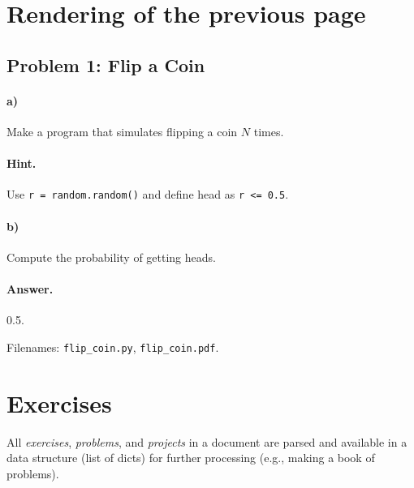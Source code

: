 \documentclass[%
twoside,                 %
final,                   %
chapterprefix=true,      %
open=right               %
10pt]{book}
\newcounter{doconce:movie:counter}
\newenvironment{doconce:exercise}{}{}
\newcounter{doconce:exercise:counter}
\begin{document}
\section*{Rendering of the previous page}




\begin{doconce:exercise}

\subsection*{Problem 1: Flip a Coin}


\paragraph{a)}
Make a program that simulates flipping a coin $N$ times.


\paragraph{Hint.}
Use \Verb!r = random.random()! and define head as \Verb!r <= 0.5!.


\paragraph{b)}
Compute the probability of getting heads.


\paragraph{Answer.}
0.5.


Filenames: \Verb!flip_coin.py!, \Verb!flip_coin.pdf!.

\end{doconce:exercise}


\section*{Exercises}

All \emph{exercises}, \emph{problems}, and \emph{projects} in a document are parsed
and available in a data structure (list of dicts) for further
processing (e.g., making a book of problems).
\end{document}
